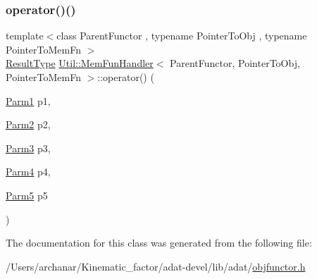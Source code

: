 \subsubsection{\texorpdfstring{operator()()}{operator()()}\hspace{0.1cm}{\footnotesize\ttfamily [18/18]}}
{\footnotesize\ttfamily template$<$class Parent\+Functor , typename Pointer\+To\+Obj , typename Pointer\+To\+Mem\+Fn $>$ \\
\mbox{\hyperlink{classUtil_1_1MemFunHandler_a093690dcced95ad48c5429e50006c83e}{Result\+Type}} \mbox{\hyperlink{classUtil_1_1MemFunHandler}{Util\+::\+Mem\+Fun\+Handler}}$<$ Parent\+Functor, Pointer\+To\+Obj, Pointer\+To\+Mem\+Fn $>$\+::operator() (\begin{DoxyParamCaption}\item[{\mbox{\hyperlink{classUtil_1_1MemFunHandler_a43182733677fc623d89e5613ecf15761}{Parm1}}}]{p1,  }\item[{\mbox{\hyperlink{classUtil_1_1MemFunHandler_a9d454c62047cb4bff3173b5bda9a38c8}{Parm2}}}]{p2,  }\item[{\mbox{\hyperlink{classUtil_1_1MemFunHandler_a6cbef94d16f4d6b29d6a8a90afbeff4f}{Parm3}}}]{p3,  }\item[{\mbox{\hyperlink{classUtil_1_1MemFunHandler_a1e5a0cf582f3b540e409d333ae06a4bd}{Parm4}}}]{p4,  }\item[{\mbox{\hyperlink{classUtil_1_1MemFunHandler_a70d588c17500255eb899788aa0e6c29d}{Parm5}}}]{p5 }\end{DoxyParamCaption})\hspace{0.3cm}{\ttfamily [inline]}}



The documentation for this class was generated from the following file\+:\begin{DoxyCompactItemize}
\item 
/\+Users/archanar/\+Kinematic\+\_\+factor/adat-\/devel/lib/adat/\mbox{\hyperlink{adat-devel_2lib_2adat_2objfunctor_8h}{objfunctor.\+h}}\end{DoxyCompactItemize}
